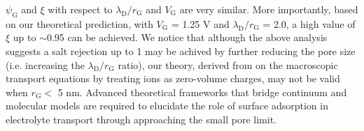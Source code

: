 $\psi_{\mathrm{G}}$ and $\xi$ with respect to
$\lambda_{\mathrm{D}}/r_{\mathrm{G}}$ and $V_{\mathrm{G}}$ are very
similar. More importantly, based on our theoretical prediction, with
$V_{\mathrm{G}}$ = 1.25 V and $\lambda_{\mathrm{D}} / r_{\mathrm{G}}$
= { 2.0}, a high value of $\xi$ up to $\sim$0.95 can be achieved.  We
notice that although the above analysis suggests a salt rejection up
to 1 may be achived by further reducing the pore size (i.e. increasing
the $\lambda_{\mathrm{D}}/r_{\mathrm{G}}$ ratio), our theory, derived
from on the macroscopic transport equations by treating ions as
zero-volume charges, may not be valid when $r_{\mathrm{G}}<$ 5
nm\cite{Jain_2015_subcontin_ion}.  Advanced
  theoretical frameworks that bridge continuum and molecular models
  are required to elucidate the role of surface adsorption in
  electrolyte transport through approaching the small pore limit. 



